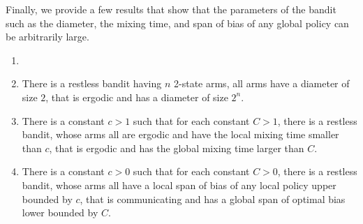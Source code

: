 Finally, we provide a few results that show that the parameters of the bandit such as the diameter, the mixing time, and span of bias of any global policy can be arbitrarily large.
\begin{thm}
    \label{thm:parameters}
    \begin{enumerate}[label=(\roman*)]
        \item[]
        \item \label{thm:diam} There is a restless bandit having $n$ 2-state arms, all arms have a diameter of size $2$, that is ergodic and has a diameter of size $2^n$. %
        \item \label{thm:mixing} There is a constant $c>1$ such that for each constant $C>1$, there is a restless bandit, whose arms all are ergodic and have the local mixing time smaller than $c$, that is ergodic and has the global mixing time larger than $C$.
        \item \label{thm:span} There is a constant $c>0$ such that for each constant $C>0$, there is a restless bandit, whose arms all have a local span of bias of any local policy upper bounded by $c$, that is communicating and has a global span of optimal bias lower bounded by $C$.
    \end{enumerate}
\end{thm}
